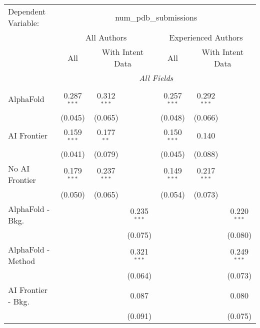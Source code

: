 \begingroup
\centering
\begin{tabular}{lcccccc}
   \tabularnewline \midrule \midrule
   Dependent Variable: & \multicolumn{6}{c}{num\_pdb\_submissions}\\
 & \multicolumn{3}{c}{All Authors} & \multicolumn{3}{c}{Experienced Authors} \\
\cmidrule(lr){2-4} \cmidrule(lr){5-7}
 & \multicolumn{1}{c}{All} & \multicolumn{2}{c}{With Intent Data} & \multicolumn{1}{c}{All} & \multicolumn{2}{c}{With Intent Data} \\
\cmidrule(lr){2-2} \cmidrule(lr){3-4} \cmidrule(lr){5-5} \cmidrule(lr){6-7}
 & \multicolumn{6}{c}{\textit{All Fields}} \\ \\
   AlphaFold               & 0.287$^{***}$ & 0.312$^{***}$ &               & 0.257$^{***}$ & 0.292$^{***}$ &   \\   
                           & (0.045)       & (0.065)       &               & (0.048)       & (0.066)       &   \\   
   AI Frontier             & 0.159$^{***}$ & 0.177$^{**}$  &               & 0.150$^{***}$ & 0.140         &   \\   
                           & (0.041)       & (0.079)       &               & (0.045)       & (0.088)       &   \\   
   No AI Frontier          & 0.179$^{***}$ & 0.237$^{***}$ &               & 0.149$^{***}$ & 0.217$^{***}$ &   \\   
                           & (0.050)       & (0.065)       &               & (0.054)       & (0.073)       &   \\   
   AlphaFold - Bkg.        &               &               & 0.235$^{***}$ &               &               & 0.220$^{***}$\\   
                           &               &               & (0.075)       &               &               & (0.080)\\   
   AlphaFold - Method      &               &               & 0.321$^{***}$ &               &               & 0.249$^{***}$\\   
                           &               &               & (0.064)       &               &               & (0.073)\\   
   AI Frontier - Bkg.      &               &               & 0.087         &               &               & 0.080\\   
                           &               &               & (0.091)       &               &               & (0.075)\\   

\end{tabular}

